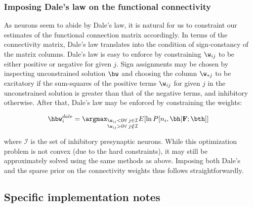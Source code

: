 \subsubsection{Imposing Dale's law on the functional connectivity}

As neurons seem to abide by Dale's law, it is natural for us to constraint our estimates of the functional connection matrix accordingly. In terms of the connectivity matrix, Dale's law translates into the condition of sign-constancy of the matrix columns. Dale's law is easy to enforce by constraining $\w_{ij}$ to be either positive or negative for given $j$.  Sign assignments may be chosen by inspecting unconstrained solution $\bw$ and choosing the column $\w_{\ast j}$ to be excitatory if the sum-squares of the positive terms $\w_{ij}$ for given $j$ in the unconstrained solution is greater than that of the negative terms, and inhibitory otherwise.  After that, Dale's law may be enforced by constraining the weights:


\begin{align}
	\hbw_i^{dale} = \argmax_{\substack{\w_{ij}<0 \forall \; j \in \mathcal{I} \\ \w_{ij}>0 \forall \; j \notin \mathcal{I} }}   E[\ln P[n_i, \bh |{\bf F}; \bth]]
\end{align}


\noindent where $\mathcal{I}$ is the set of inhibitory presynaptic neurons.  While this optimization problem is not convex (due to the hard constraints), it may still be approximately solved using the same methods as above.  Imposing both Dale's and the sparse prior on the connectivity weights thus follows straightforwardly.  

\subsection{Specific implementation notes} \label{sec:methods:specific_implementation}


